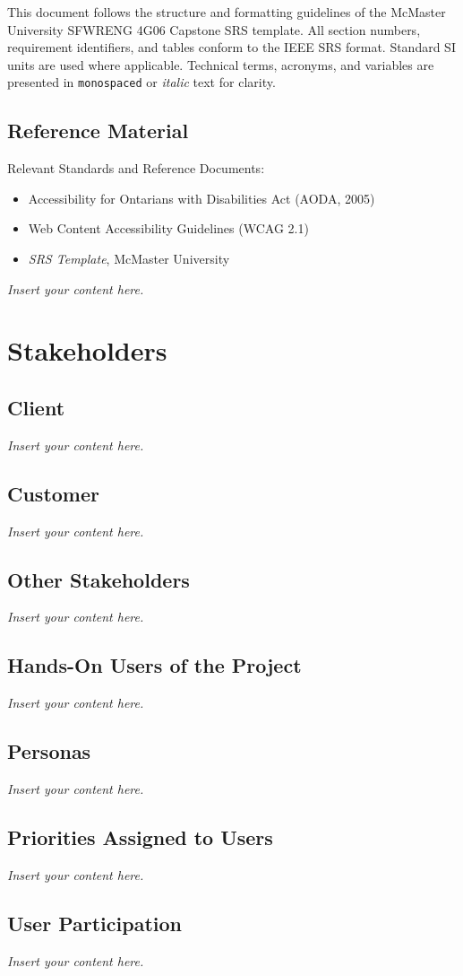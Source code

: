 \documentclass[12pt]{article}
\newcommand{\lips}{\textit{Insert your content here.}}
\begin{document}
This document follows the structure and formatting guidelines of the McMaster University SFWRENG 4G06 Capstone SRS template. 
All section numbers, requirement identifiers, and tables conform to the IEEE SRS format. 
Standard SI units are used where applicable. 
Technical terms, acronyms, and variables are presented in \texttt{monospaced} or \textit{italic} text for clarity.

\subsection{Reference Material}
Relevant Standards and Reference Documents:
\begin{itemize}
    \item Accessibility for Ontarians with Disabilities Act (AODA, 2005)
    \item Web Content Accessibility Guidelines (WCAG 2.1)
    \item \textit{SRS Template}, McMaster University
\end{itemize}


\lips
\section{Stakeholders}
\subsection{Client}
\lips
\subsection{Customer}
\lips
\subsection{Other Stakeholders}
\lips
\subsection{Hands-On Users of the Project}
\lips
\subsection{Personas}
\lips
\subsection{Priorities Assigned to Users}
\lips
\subsection{User Participation}
\lips
\end{document}

